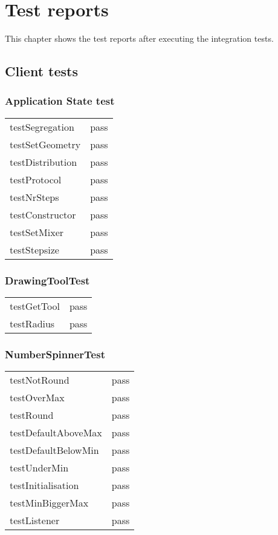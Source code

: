 \chapter{Test reports}\label{chap:testReports}

This chapter shows the test reports after executing the integration tests.

\section{Client tests}
\subsection*{Application State test}
\begin{tabular}{l|l}
testSegregation   & pass \\
testSetGeometry & pass \\
testDistribution    & pass \\
testProtocol         & pass \\
testNrSteps         & pass \\
testConstructor   & pass \\
testSetMixer        & pass \\
testStepsize         & pass \\
\end{tabular}

\subsection*{DrawingToolTest}
\begin{tabular}{l|l}
testGetTool   & pass \\
testRadius    & pass \\
\end{tabular}

\subsection*{NumberSpinnerTest}
\begin{tabular}{l|l}
testNotRound               & pass \\
testOverMax                & pass \\
testRound                    & pass \\
testDefaultAboveMax  & pass \\
testDefaultBelowMin    & pass \\
testUnderMin               & pass \\
testInitialisation           & pass \\
testMinBiggerMax        & pass \\
testListener                 & pass \\
\end{tabular}

